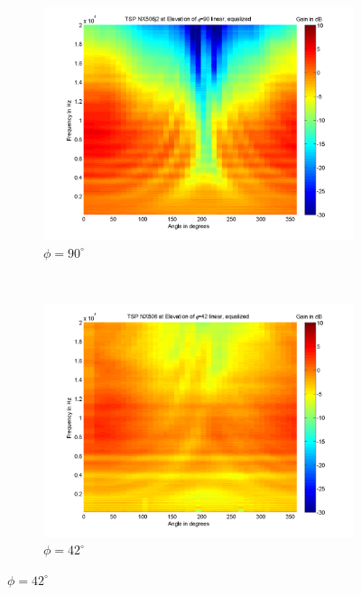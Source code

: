 \clearpage
{}

\begin{figure}[t!]
        \centering
        
        \caption[Measurement results {\nexus} (6), mid-air]{{\nexus}, labelled with number 6, measurements in mid-air, equalized}
        \label{fig:res_NX506_pluis}

        \begin{subfigure}[t]{0.5\textwidth}
			    \caption{$\phi=90^\circ$}
			    \label{fig:res_NX506_pluis_90}
                \centering
    			\includegraphics[height=0.28\textheight]{afbeeldingen/plots/results/NX506j2_TSP_090_lin_eq.png}
        \end{subfigure}~
        \begin{subfigure}[t]{0.5\textwidth}
			    \caption{$\phi=42^\circ$}
			    \label{fig:res_NX506_pluis_42}
                \centering
    			\includegraphics[height=0.28\textheight]{afbeeldingen/plots/results/NX506_TSP_042_lin_eq.png}
        \end{subfigure}
        

\end{figure}
